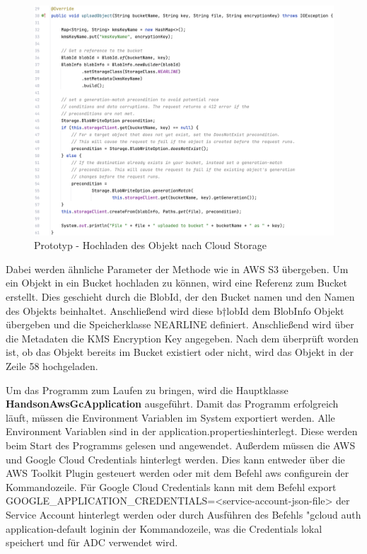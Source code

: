 \begin{figure}[h]
	\centering
	\includegraphics[width=15cm,keepaspectratio]{Pictures/UploadObjectGC.png}
	\caption{Prototyp - Hochladen des Objekt nach Cloud Storage}
\end{figure}

Dabei werden ähnliche Parameter der Methode wie in AWS S3 übergeben. Um ein Objekt in ein Bucket hochladen zu können, wird eine Referenz zum Bucket erstellt. Dies geschieht durch die BlobId, der den Bucket namen und den Namen des Objekts beinhaltet. Anschließend wird diese b†lobId dem BlobInfo Objekt übergeben und die Speicherklasse NEARLINE definiert. Anschließend wird über die Metadaten die KMS Encryption Key angegeben. Nach dem überprüft worden ist, ob das Objekt bereits im Bucket existiert oder nicht, wird das Objekt in der Zeile 58 hochgeladen.

Um das Programm zum Laufen zu bringen, wird die Hauptklasse \textbf{HandsonAwsGcApplication} ausgeführt. Damit das Programm erfolgreich läuft, müssen die Environment Variablen im System exportiert werden. Alle Environment Variablen sind in der \glqq application.properties\grqq hinterlegt. Diese werden beim Start des Programms gelesen und angewendet. Außerdem müssen die AWS  und Google Cloud Credentials hinterlegt werden. Dies kann entweder über die AWS Toolkit Plugin gesteuert werden oder mit dem Befehl \glqq aws configure\grqq in der Kommandozeile. Für Google Cloud Credentials kann mit dem Befehl \glqq export GOOGLE\_APPLICATION\_CREDENTIALS=<service-account-json-file> der Service Account hinterlegt werden oder durch Ausführen des Befehls "gcloud auth application-default login\grqq in der Kommandozeile, was die Credentials lokal speichert und für ADC verwendet wird.

